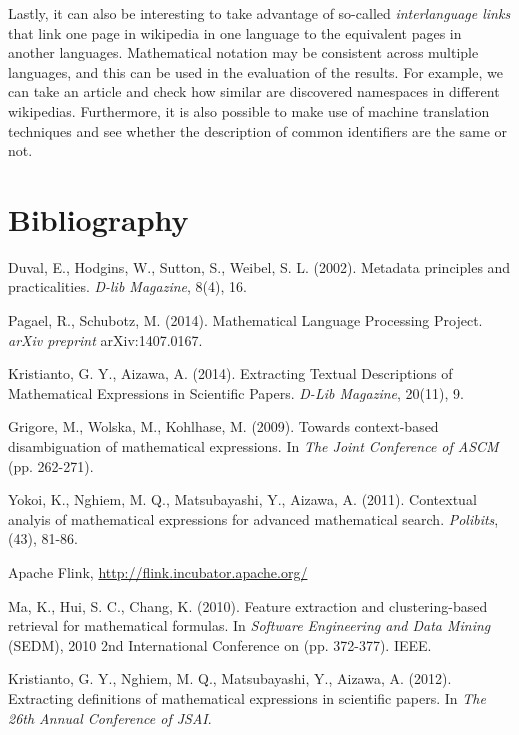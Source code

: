 \documentclass[12pt,a4paper]{article}
\begin{document}
Lastly, it can also be interesting to take advantage of so-called \emph{interlanguage links} that link one page in wikipedia in one language to the equivalent pages in another languages. Mathematical notation may be consistent across multiple languages, and this can be used in the evaluation of the results. For example, we can take an article and check how similar are discovered namespaces in different wikipedias. Furthermore, it is also possible to make use of machine translation techniques and see whether the description of common identifiers are the same or not.


\section{Bibliography}

\begin{thebibliography}{50}

  Duval, E., Hodgins, W., Sutton, S., Weibel, S. L. (2002). Metadata principles and practicalities. \emph{D-lib Magazine}, 8(4), 16.

 Pagael, R., Schubotz, M. (2014). Mathematical Language Processing Project. \emph{arXiv preprint} arXiv:1407.0167.

 Kristianto, G. Y., Aizawa, A. (2014). Extracting Textual Descriptions of Mathematical Expressions in Scientific Papers. \emph{D-Lib Magazine}, 20(11), 9.

 Grigore, M., Wolska, M.,  Kohlhase, M. (2009). Towards context-based disambiguation of mathematical expressions. In \emph{The Joint Conference of ASCM} (pp. 262-271).

 Yokoi, K., Nghiem, M. Q., Matsubayashi, Y., Aizawa, A. (2011). Contextual analyis of mathematical expressions for advanced mathematical search. \emph{Polibits}, (43), 81-86.

 Apache Flink, \url{http://flink.incubator.apache.org/}

 Ma, K., Hui, S. C., Chang, K. (2010). Feature extraction and clustering-based retrieval for mathematical formulas. In \emph{Software Engineering and Data Mining} (SEDM), 2010 2nd International Conference on (pp. 372-377). IEEE.

 Kristianto, G. Y., Nghiem, M. Q., Matsubayashi, Y., Aizawa, A. (2012). Extracting definitions of mathematical expressions in scientific papers. In \emph{The 26th Annual Conference of JSAI}.


\end{thebibliography}
\end{document}
